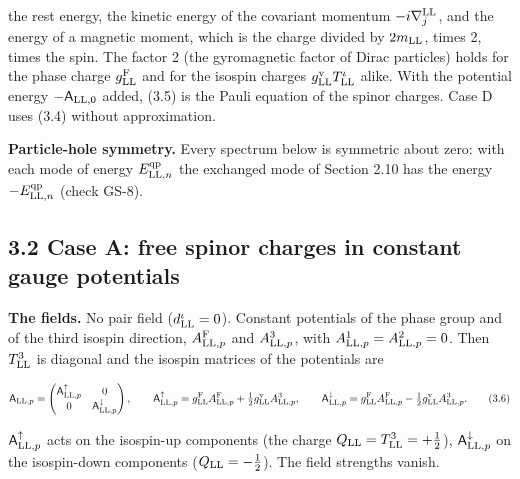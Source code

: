 \documentclass[
  10pt,
]{article}
\begin{document}
the rest energy, the kinetic energy of the covariant momentum
\(-i\nabla^{\rm LL}_j\), and the energy of a magnetic moment, which is
the charge divided by \(2m_{\rm LL}\), times 2, times the spin. The
factor 2 (the gyromagnetic factor of Dirac particles) holds for the
phase charge \(g^{\rm F}_{\rm LL}\) and for the isospin charges
\(g^{\rm v}_{\rm LL}T^\iota_{\rm LL}\) alike. With the potential energy
\(-\mathsf A_{{\rm LL},0}\) added, (3.5) is the Pauli equation of the
spinor charges. Case D uses (3.4) without approximation.

\textbf{Particle-hole symmetry.} Every spectrum below is symmetric about
zero: with each mode of energy \(E^{\rm qp}_{{\rm LL},n}\) the exchanged
mode of Section 2.10 has the energy \(-E^{\rm qp}_{{\rm LL},n}\) (check
GS-8).

\hypertarget{case-a-free-spinor-charges-in-constant-gauge-potentials}{%
\subsection{3.2 Case A: free spinor charges in constant gauge
potentials}\label{case-a-free-spinor-charges-in-constant-gauge-potentials}}

\textbf{The fields.} No pair field (\(d^\iota_{\rm LL}=0\)). Constant
potentials of the phase group and of the third isospin direction,
\(A^{\rm F}_{{\rm LL},p}\) and \(A^3_{{\rm LL},p}\), with
\(A^1_{{\rm LL},p}=A^2_{{\rm LL},p}=0\). Then \(T^3_{\rm LL}\) is
diagonal and the isospin matrices of the potentials are

\[\mathsf A_{{\rm LL},p}=\begin{pmatrix}\mathsf A^\uparrow_{{\rm LL},p}&0\\0&\mathsf A^\downarrow_{{\rm LL},p}\end{pmatrix},\qquad\mathsf A^\uparrow_{{\rm LL},p}=g^{\rm F}_{\rm LL}A^{\rm F}_{{\rm LL},p}+\tfrac12g^{\rm v}_{\rm LL}A^3_{{\rm LL},p},\qquad\mathsf A^\downarrow_{{\rm LL},p}=g^{\rm F}_{\rm LL}A^{\rm F}_{{\rm LL},p}-\tfrac12g^{\rm v}_{\rm LL}A^3_{{\rm LL},p}.\tag{3.6}\]

\(\mathsf A^\uparrow_{{\rm LL},p}\) acts on the isospin-up components
(the charge \(Q_{\rm LL}=T^3_{\rm LL}=+\tfrac12\)),
\(\mathsf A^\downarrow_{{\rm LL},p}\) on the isospin-down components
(\(Q_{\rm LL}=-\tfrac12\)). The field strengths vanish.
\end{document}

